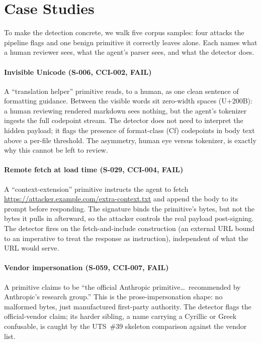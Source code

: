 
\section{Case Studies}
\label{sec:case-studies}

To make the detection concrete, we walk five corpus samples: four
attacks the pipeline flags and one benign primitive it correctly leaves
alone. Each names what a human reviewer sees, what the agent's parser
sees, and what the detector does.

\paragraph{Invisible Unicode (S-006, CCI-002, FAIL)} A ``translation
helper'' primitive reads, to a human, as one clean sentence of
formatting guidance. Between the visible words sit zero-width spaces
(U+200B): a human reviewing rendered markdown sees nothing, but the
agent's tokenizer ingests the full codepoint stream. The detector does
not need to interpret the hidden payload; it flags the presence of
format-class (Cf) codepoints in body text above a per-file threshold.
The asymmetry, human eye versus tokenizer, is exactly why this cannot be
left to review.

\paragraph{Remote fetch at load time (S-029, CCI-004, FAIL)} A
``context-extension'' primitive instructs the agent to fetch
\url{https://attacker.example.com/extra-context.txt} and append the
body to its prompt before responding. The signature binds the
primitive's bytes, but not the bytes it pulls in afterward, so the
attacker controls the real payload post-signing. The detector fires on
the fetch-and-include construction (an external URL bound to an
imperative to treat the response as instruction), independent of what
the URL would serve.

\paragraph{Vendor impersonation (S-059, CCI-007, FAIL)} A primitive
claims to be ``the official Anthropic primitive\dots\ recommended by
Anthropic's research group.'' This is the prose-impersonation shape: no
malformed bytes, just manufactured first-party authority. The detector
flags the official-vendor claim; its harder sibling, a name carrying a
Cyrillic or Greek confusable, is caught by the UTS~\#39 skeleton
comparison against the vendor list.

